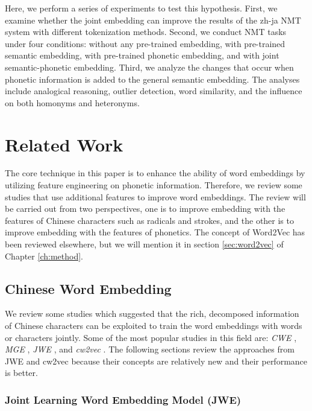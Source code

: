 Here, we perform a series of experiments to test this hypothesis. First, we examine whether the joint embedding can improve the results of the zh-ja NMT system with different tokenization methods. Second, we conduct NMT tasks under four conditions: without any pre-trained embedding, with pre-trained semantic embedding, with pre-trained phonetic embedding, and with joint semantic-phonetic embedding. Third, we analyze the changes that occur when phonetic information is added to the general semantic embedding. The analyses include analogical reasoning, outlier detection, word similarity, and the influence on both homonyms and heteronyms.

\section{Related Work} \label{sec:related_work}

The core technique in this paper is to enhance the ability of word embeddings by utilizing feature engineering on phonetic information. Therefore, we review some studies that use additional features to improve word embeddings. The review will be carried out from two perspectives, one is to improve embedding with the features of Chinese characters such as radicals and strokes, and the other is to improve embedding with the features of phonetics.  The concept of Word2Vec \cite{mikolov2013efficient} has been reviewed elsewhere, but we will mention it in section \ref{sec:word2vec} of Chapter \ref{ch:method}.

\subsection{Chinese Word Embedding} \label{sec:rw_cwe}

We review some studies which suggested that the rich, decomposed information of Chinese characters can be exploited to train the word embeddings with words or characters jointly. Some of the most popular studies in this field are: \textit{CWE} \cite{chen2015joint}, \textit{MGE} \cite{yin2016multi}, \textit{JWE} \cite{yu2017joint}, and \textit{cw2vec} \cite{cao2018cw2vec}. The following sections review the approaches from JWE and cw2vec because their concepts are relatively new and their performance is better.

\subsubsection{Joint Learning Word Embedding Model (JWE)}

